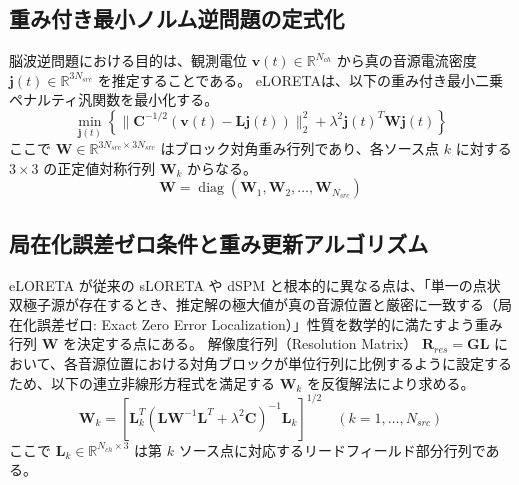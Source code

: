 \documentclass[platex,dvipdfmx,12pt]{jsarticle}
\begin{document}
\subsection{重み付き最小ノルム逆問題の定式化}
脳波逆問題における目的は、観測電位 $\mathbf{v}(t) \in \mathbb{R}^{N_{ch}}$ から真の音源電流密度 $\mathbf{j}(t) \in \mathbb{R}^{3 N_{src}}$ を推定することである。
eLORETA\cite{pascual2007eloreta, pascual2011eloreta_technical}は、以下の重み付き最小二乗ペナルティ汎関数を最小化する。
\begin{equation}
  \min_{\mathbf{j}(t)} \left\{ \|\mathbf{C}^{-1/2} (\mathbf{v}(t) - \mathbf{L} \mathbf{j}(t))\|_2^2 + \lambda^2 \mathbf{j}(t)^T \mathbf{W} \mathbf{j}(t) \right\}
  \label{eq:eloreta_cost}
\end{equation}
ここで $\mathbf{W} \in \mathbb{R}^{3 N_{src} \times 3 N_{src}}$ はブロック対角重み行列であり、各ソース点 $k$ に対する $3 \times 3$ の正定値対称行列 $\mathbf{W}_k$ からなる。
\begin{equation}
  \mathbf{W} = \operatorname{diag}(\mathbf{W}_1, \mathbf{W}_2, \dots, \mathbf{W}_{N_{src}})
  \label{eq:weight_matrix}
\end{equation}

\subsection{局在化誤差ゼロ条件と重み更新アルゴリズム}
eLORETA が従来の sLORETA や dSPM と根本的に異なる点は、「単一の点状双極子源が存在するとき、推定解の極大値が真の音源位置と厳密に一致する（局在化誤差ゼロ: Exact Zero Error Localization）」性質を数学的に満たすよう重み行列 $\mathbf{W}$ を決定する点にある。
解像度行列（Resolution Matrix） $\mathbf{R}_{res} = \mathbf{G} \mathbf{L}$ において、各音源位置における対角ブロックが単位行列に比例するように設定するため、以下の連立非線形方程式を満足する $\mathbf{W}_k$ を反復解法により求める。
\begin{equation}
  \mathbf{W}_k = \left[ \mathbf{L}_k^T \left( \mathbf{L} \mathbf{W}^{-1} \mathbf{L}^T + \lambda^2 \mathbf{C} \right)^{-1} \mathbf{L}_k \right]^{1/2} \quad (k=1, \dots, N_{src})
  \label{eq:eloreta_weight_update}
\end{equation}
ここで $\mathbf{L}_k \in \mathbb{R}^{N_{ch} \times 3}$ は第 $k$ ソース点に対応するリードフィールド部分行列である。
\end{document}
